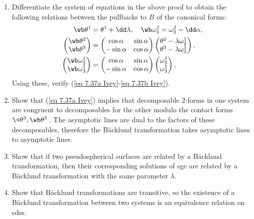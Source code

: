 \begin{xca}
    \begin{enumerate}
        \item Differentiate the system of equations in the above proof to obtain the following relations between the pullbacks to $B$ of the canonical forms:
        \begin{align}
            \wb\theta^1&=\theta^1+\dd\lambda,\quad \wb\omega^2_3=\omega^2_3-\dd\alpha,\\
            \begin{pmatrix}
                \wb\theta^2\\\wb\theta^3
            \end{pmatrix}&=
            \begin{pmatrix}
                \cos\alpha & \sin\alpha \\
                -\sin\alpha & \cos\alpha
            \end{pmatrix}\begin{pmatrix}
                \theta^2-\lambda\omega^1_2\\
                \theta^3-\lambda\omega^1_3
            \end{pmatrix},\\
            \begin{pmatrix}
                \wb\omega^1_2\\\wb\omega^1_3
            \end{pmatrix}&=
            \begin{pmatrix}
                \cos\alpha & \sin\alpha \\
                -\sin\alpha & \cos\alpha
            \end{pmatrix}\begin{pmatrix}
                \omega^1_2\\
                \omega^1_3
            \end{pmatrix},
        \end{align}
        Using these, verify (\ref{eq 7.37a Ivey}-\ref{eq 7.37b Ivey}).
        \item Show that (\ref{eq 7.37a Ivey}) implies that decomposable $2$-forms in one system are congruent to decomposables for the other modulo the contact forms $\<\theta^3,\wb\theta^3\>$. The asymptotic lines are dual to the factors of these decomposables, therefore the B\"acklund transformation takes asymptotic lines to asymptotic lines.
        \item Show that if two pseudospherical surfaces are related by a B\"acklund transformation, then their corresponding solutions of \gls{sge} are related by a B\"acklund transformation with the same parameter $\lambda$.
        \item Show that B\"acklund transformations are transitive, so the existence of a B\"acklund transformation between two systems is an equivalence relation on \glspl{eds}.
    \end{enumerate}
\end{xca}


